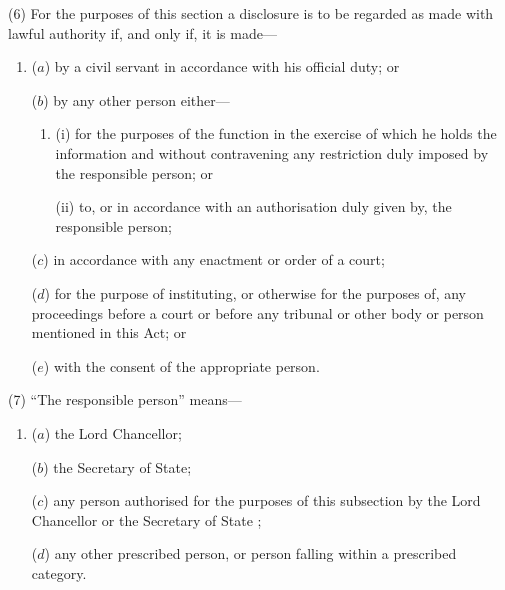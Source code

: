 \documentclass[12pt,a4paper]{article}
\begin{document}
(6) For the purposes of this section a disclosure is to be regarded as made with lawful authority if, and only if, it is made—
\begin{enumerate}\item[]
($a$) by a civil servant in accordance with his official duty; or

($b$) by any other person either—
\begin{enumerate}\item[]
(i) for the purposes of the function in the exercise of which he holds the information and without contravening any restriction duly imposed by the responsible person; or

(ii) to, or in accordance with an authorisation duly given by, the responsible person;
\end{enumerate}

($c$) in accordance with any enactment or order of a court;

($d$) for the purpose of instituting, or otherwise for the purposes of, any proceedings before a court or before any tribunal or other body or person mentioned in this Act; or

($e$) with the consent of the appropriate person.
\end{enumerate}

(7) “The responsible person” means—
\begin{enumerate}\item[]
($a$) the Lord Chancellor;

($b$) the Secretary of State;



($c$) any person authorised for the purposes of this subsection by the Lord Chancellor
or the Secretary of State%
;

($d$) any other prescribed person, or person falling within a prescribed category.
\end{enumerate}
\end{document}
